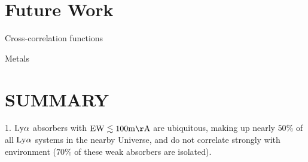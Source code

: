 \documentclass[twocolumn,tighten]{aastex62}
\newcommand{\kms}{$\rm km\, s^{-1}$}
\begin{document}
\section{Future Work}

Cross-correlation functions \cite{chen2005}

Metals





\section{SUMMARY}
1. $\rm Ly\alpha$ absorbers with $\rm EW \lesssim 100 m\AA$ are ubiquitous, making up nearly $50\%$ of all $\rm Ly\alpha$ systems in the nearby Universe, and do not correlate strongly with environment ($70\%$ of these weak absorbers are isolated). 




\end{document}
